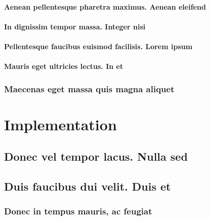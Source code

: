 \documentclass[%
  german,%
  exercise,%
  oneside,%
]{iswartcl}
\begin{document}
\lipsum[1-8]

\subsubsection{Aenean pellentesque pharetra maximus. Aenean eleifend}

\lipsum[1-8]

\subsubsection{In dignissim tempor massa. Integer nisi}

\lipsum[1-8]

\subsubsection{Pellentesque faucibus euismod facilisis. Lorem ipsum}

\lipsum[1-8]

\subsubsection{Mauris eget ultricies lectus. In et}

\lipsum[1-8]

\subsection{Maecenas eget massa quis magna aliquet}

\lipsum[1-8]





\chapter{Implementation}

\lipsum[1-8]

\section{Donec vel tempor lacus. Nulla sed}

\lipsum[1-8]

\section{Duis faucibus dui velit. Duis et}

\lipsum[1-8]

\subsection{Donec in tempus mauris, ac feugiat}
\end{document}
